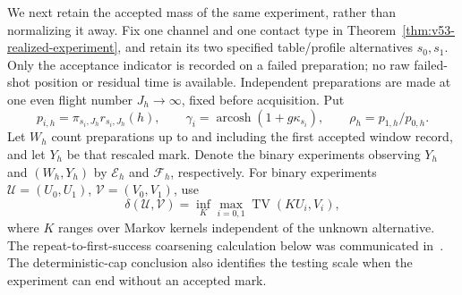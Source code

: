 We next retain the accepted mass of the same experiment, rather than
normalizing it away.  Fix one channel and one contact type in
Theorem~\ref{thm:v53-realized-experiment}, and retain its two specified
table/profile alternatives $s_0,s_1$.  Only the acceptance indicator is
recorded on a failed preparation; no raw failed-shot position or residual
time is available.  Independent preparations are made at one even flight
number $J_h\to\infty$, fixed before acquisition.  Put
\begin{equation}\label{eq:v54-accepted-probability}
 p_{i,h}=\pi_{s_i,J_h}r_{s_i,J_h}(h),\qquad
 \gamma_i=\operatorname{arcosh}(1+g\kappa_{s_i}),\qquad
 \rho_h=p_{1,h}/p_{0,h}.
\end{equation}
Let $W_h$ count preparations up to and including the first accepted
window record, and let $Y_h$ be that rescaled mark.  Denote the binary
experiments observing $Y_h$ and $(W_h,Y_h)$ by $\mathcal E_h$ and
$\mathcal F_h$, respectively.  For binary experiments
$\mathcal U=(U_0,U_1)$, $\mathcal V=(V_0,V_1)$, use
\[
 \delta(\mathcal U,\mathcal V)
   =\inf_K\max_{i=0,1}\operatorname{TV}(KU_i,V_i),
\]
where $K$ ranges over Markov kernels independent of the unknown
alternative.  The repeat-to-first-success coarsening calculation below
was communicated in~\cite{A2ReviewV53}.  The deterministic-cap conclusion
also identifies the testing scale when the experiment can end without an
accepted mark.

